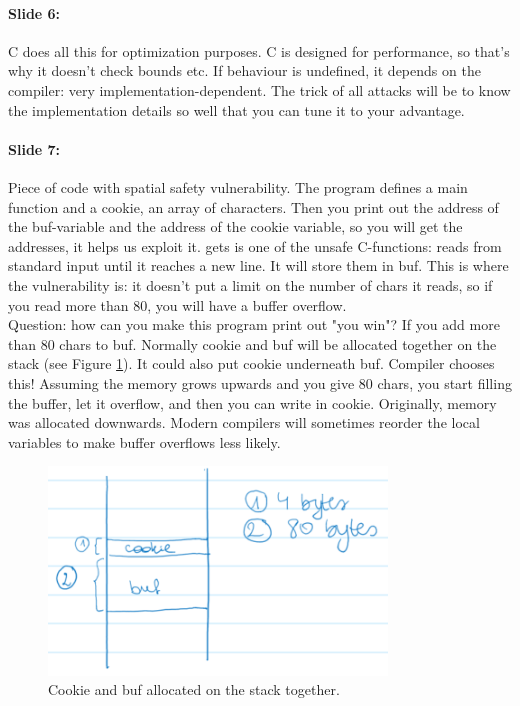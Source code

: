 \documentclass[10pt,a4paper]{report}
\begin{document}
\paragraph{Slide 6:} C does all this for optimization purposes. C is designed for performance, so that's why it doesn't check bounds etc. If behaviour is undefined, it depends on the compiler: very implementation-dependent. The trick of all attacks will be to know the implementation details so well that you can tune it to your advantage.

\paragraph{Slide 7:} Piece of code with spatial safety vulnerability. The program defines a main function and a cookie, an array of characters. Then you print out the address of the buf-variable and the address of the cookie variable, so you will get the addresses, it helps us exploit it. gets is one of the unsafe C-functions: reads from standard input until it reaches a new line. It will store them in buf. This is where the vulnerability is: it doesn't put a limit on the number of chars it reads, so if you read more than 80, you will have a buffer overflow.\\
Question: how can you make this program print out "you win"? If you add more than 80 chars to buf. Normally cookie and buf will be allocated together on the stack (see Figure \ref{les2_01}). It could also put cookie underneath buf. Compiler chooses this! Assuming the memory grows upwards and you give 80 chars, you start filling the buffer, let it overflow, and then you can write in cookie. Originally, memory was allocated downwards. Modern compilers will sometimes reorder the local variables to make buffer overflows less likely.

\begin{figure}[ht!]
\centering
\includegraphics[width=90mm]{Les2_01.png}
\caption{Cookie and buf allocated on the stack together.} 
\label{les2_01}
\end{figure}
\end{document}

